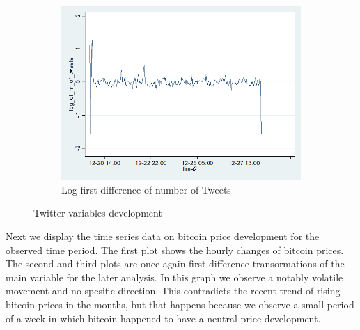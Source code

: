 \documentclass[a4paper,american,12pt]{article}
\begin{document}
\begin{spacing}{1.2}
\begin{figure}[H]
\begin{subfigure}{.3\textwidth}
	\includegraphics[width=1.12\textwidth]{stata_export_graphs/graph_plot_log_df_nr_tweets.png}
	\caption{Log first difference of number of Tweets}
	\end{subfigure}
\caption{Twitter variables development}
\end{figure}

Next we display the time series data on bitcoin price development for the observed time period. The first plot shows the hourly changes of bitcoin prices. The second and third plots are once again first difference transormations of the main variable for the later analysis. In this graph we observe a notably volatile movement and no spesific direction. This contradicts the recent trend of rising bitcoin prices in the months, but that happens because we observe a small period of a week in which bitcoin happened to have a neutral price development.\\


\end{spacing}
\end{document}

